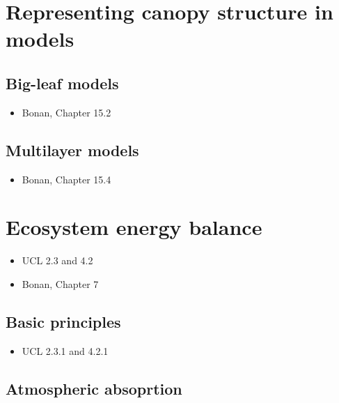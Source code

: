 \documentclass[
  oneside]{book}
\providecommand{\tightlist}{%
  \setlength{\itemsep}{0pt}\setlength{\parskip}{0pt}}
\begin{document}
\hypertarget{representing-canopy-structure-in-models}{%
\section{Representing canopy structure in models}\label{representing-canopy-structure-in-models}}

\hypertarget{big-leaf-models}{%
\subsection{Big-leaf models}\label{big-leaf-models}}

\begin{itemize}
\tightlist
\item
  Bonan, Chapter 15.2
\end{itemize}

\hypertarget{multilayer-models}{%
\subsection{Multilayer models}\label{multilayer-models}}

\begin{itemize}
\tightlist
\item
  Bonan, Chapter 15.4
\end{itemize}

\hypertarget{ecosystem-energy-balance}{%
\section{Ecosystem energy balance}\label{ecosystem-energy-balance}}

\begin{itemize}
\tightlist
\item
  UCL 2.3 and 4.2
\item
  Bonan, Chapter 7
\end{itemize}

\hypertarget{basic-principles}{%
\subsection{Basic principles}\label{basic-principles}}

\begin{itemize}
\tightlist
\item
  UCL 2.3.1 and 4.2.1
\end{itemize}

\hypertarget{atmospheric-absoprtion}{%
\subsection{Atmospheric absoprtion}\label{atmospheric-absoprtion}}
\end{document}
